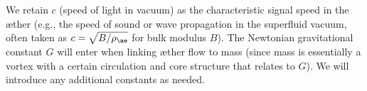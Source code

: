We retain $c$ (speed of light in vacuum) as the characteristic signal speed in the æther (e.g., the speed of sound or wave propagation in the superfluid vacuum, often taken as $c = \sqrt{B/\rho_{\ae}}$ for bulk modulus $B$). The Newtonian gravitational constant $G$ will enter when linking æther flow to mass (since mass is essentially a vortex with a certain circulation and core structure that relates to $G$). We will introduce any additional constants as needed.
